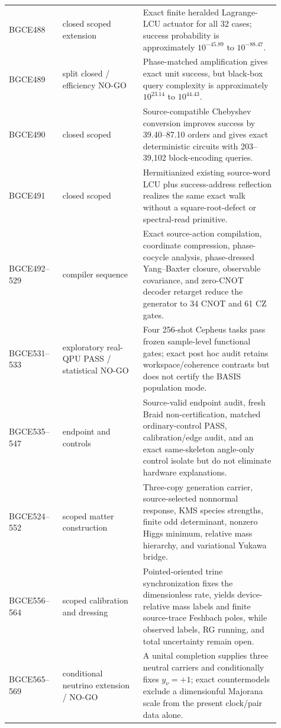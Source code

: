 \documentclass[11pt]{article}
\theoremstyle{definition}
\theoremstyle{remark}
\begin{document}
\begin{longtable}{>{\raggedright\arraybackslash}p{0.18\linewidth} >{\raggedright\arraybackslash}p{0.27\linewidth} >{\raggedright\arraybackslash}p{0.46\linewidth}}
BGCE488 & closed scoped extension & Exact finite heralded Lagrange-LCU actuator for all 32 cases; success probability is approximately $10^{-45.89}$ to $10^{-88.47}$. \\
BGCE489 & split closed / efficiency NO-GO & Phase-matched amplification gives exact unit success, but black-box query complexity is approximately $10^{23.14}$ to $10^{44.43}$. \\
BGCE490 & closed scoped & Source-compatible Chebyshev conversion improves success by 39.40--87.10 orders and gives exact deterministic circuits with 203--39,102 block-encoding queries. \\
BGCE491 & closed scoped & Hermitianized existing source-word LCU plus success-address reflection realizes the same exact walk without a square-root-defect or spectral-read primitive. \\
BGCE492--529 & compiler sequence & Exact source-action compilation, coordinate compression, phase-cocycle analysis, phase-dressed Yang--Baxter closure, observable covariance, and zero-CNOT decoder retarget reduce the generator to 34 CNOT and 61 CZ gates. \\
BGCE531--533 & exploratory real-QPU PASS / statistical NO-GO & Four 256-shot Cepheus tasks pass frozen sample-level functional gates; exact post hoc audit retains workspace/coherence contrasts but does not certify the BASIS population mode. \\
BGCE535--547 & endpoint and controls & Source-valid endpoint audit, fresh Braid non-certification, matched ordinary-control PASS, calibration/edge audit, and an exact same-skeleton angle-only control isolate but do not eliminate hardware explanations. \\
BGCE524--552 & scoped matter construction & Three-copy generation carrier, source-selected nonnormal response, KMS species strengths, finite odd determinant, nonzero Higgs minimum, relative mass hierarchy, and variational Yukawa bridge. \\
BGCE556--564 & scoped calibration and dressing & Pointed-oriented trine synchronization fixes the dimensionless rate, yields device-relative mass labels and finite source-trace Feshbach poles, while observed labels, RG running, and total uncertainty remain open. \\
BGCE565--569 & conditional neutrino extension / NO-GO & A unital completion supplies three neutral carriers and conditionally fixes $y_\nu=+1$; exact countermodels exclude a dimensionful Majorana scale from the present clock/pair data alone. \\

\end{longtable}
\end{document}
